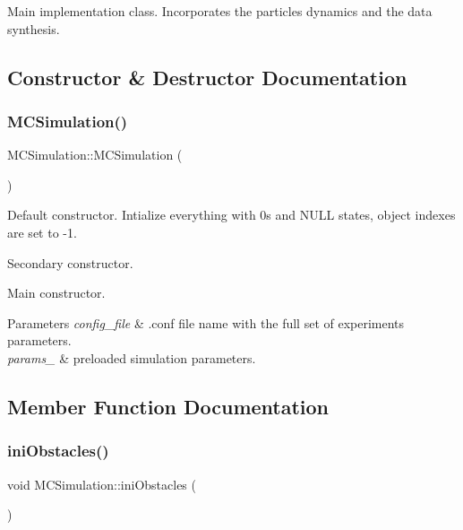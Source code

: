 Main implementation class. Incorporates the particle\textquotesingle{}s dynamics and the data synthesis. 

\subsection{Constructor \& Destructor Documentation}
\mbox{\label{class_m_c_simulation_a89f56682a13f0bcb2c53d191ca336e35}} 
\subsubsection{\texorpdfstring{M\+C\+Simulation()}{MCSimulation()}}
{\footnotesize\ttfamily M\+C\+Simulation\+::\+M\+C\+Simulation (\begin{DoxyParamCaption}{ }\end{DoxyParamCaption})}



Default constructor. Intialize everything with 0\textquotesingle{}s and N\+U\+LL states, object indexes are set to -\/1. 

Secondary constructor.

Main constructor.


\begin{DoxyParams}{Parameters}
{\em config\+\_\+file} & .conf file name with the full set of experiments parameters.\\
\hline
{\em params\+\_\+} & preloaded simulation parameters. \\
\hline
\end{DoxyParams}


\subsection{Member Function Documentation}
\mbox{\label{class_m_c_simulation_aa60234e3f6d2a100c8b03e4f304b07f4}} 
\subsubsection{\texorpdfstring{ini\+Obstacles()}{iniObstacles()}}
{\footnotesize\ttfamily void M\+C\+Simulation\+::ini\+Obstacles (\begin{DoxyParamCaption}{ }\end{DoxyParamCaption})}

